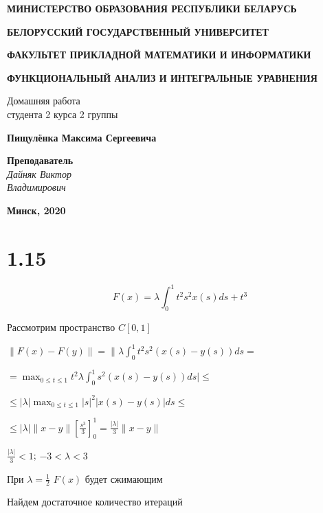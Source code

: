 \documentclass[a4paper]{article}
\begin{document}
\begin{titlepage}


  
  \centerline{\large \bf МИНИСТЕРСТВО ОБРАЗОВАНИЯ РЕСПУБЛИКИ БЕЛАРУСЬ}
  \bigskip
  \bigskip
  \centerline{\large \bf БЕЛОРУССКИЙ ГОСУДАРСТВЕННЫЙ УНИВЕРСИТЕТ}
  \bigskip
  \bigskip
  \centerline{\large \bf ФАКУЛЬТЕТ ПРИКЛАДНОЙ МАТЕМАТИКИ И ИНФОРМАТИКИ}
  \vfill
  \vfill
  \vfill
  \centerline{\Large \bf ФУНКЦИОНАЛЬНЫЙ АНАЛИЗ И ИНТЕГРАЛЬНЫЕ УРАВНЕНИЯ}
  \bigskip
  \bigskip
  \vfill
  \begin{centering}
    {\large
    Домашняя работа\\
    студента 2 курса 2 группы \\}
  \end{centering}
  \centerline{\large \bf Пищулёнка Максима Сергеевича}
  \vfill
  \vfill
  \hfill
  \begin{minipage}{0.25\textwidth}
    {\large{\bf Преподаватель} \\
  {\it Дайняк Виктор \\ Владимирович}}
  \end{minipage}
  \vfill
  \vfill
  \centerline{\Large \bf Минск, 2020}
  
  \end{titlepage}

\begin{center}
\end{center}

\section*{1.15}

\[F(x) = \lambda \int_0^1 t^2 s^2 x(s) ds + t^3 \]

Рассмотрим пространство $C[0, 1]$

$\| F(x) - F(y) \| = \| \lambda \int_0^1 t^2 s^2 \left( x(s) - y(s) \right) ds =$

$= \max_{0 \le t \le 1} t^2 \lambda \int_0^1  s^2 \left( x(s) - y(s) \right) ds | \le$

$\le | \lambda | \max_{0 \le t \le 1} |s|^2 |x(s) - y(s)| ds \le$

$\le | \lambda | \| x-y \| [\frac{s^3}{3}]_0^1 = \frac{|\lambda|}{3} \| x-y \| $

$\frac{|\lambda|}{3} < 1$; $-3 < \lambda < 3$

При $\lambda = \frac{1}{2}$  $F(x)$ будет сжимающим

Найдем достаточное количество итераций
\end{document}

